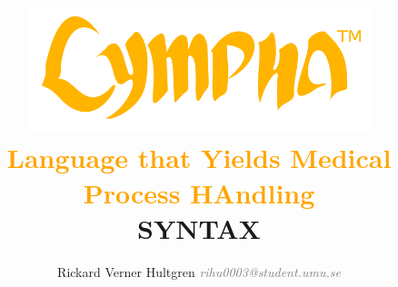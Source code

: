 \documentclass[15pt,a4paper,oneside]{article}
\begin{document}
\title{\vspace{-3cm}
{\includegraphics[width=0.75\textwidth]{logo.png}}\vspace{-0.6cm}\\ \textcolor{orange}{\large{\sc Language} {that} {\sc Yields Medical Process HAndling}}\vspace{0.3cm}\\{\Huge {\bf SYNTAX}}}
\author{\vspace{-0cm}Rickard Verner Hultgren \textit{\textcolor{grey}{rihu0003@student.umu.se}}\\\\
}
\end{document}

